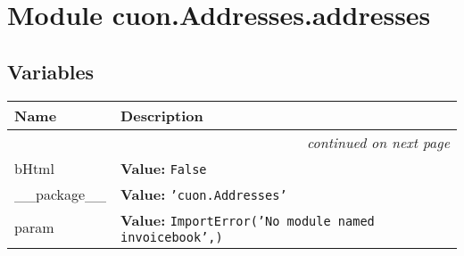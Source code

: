 %
%
%


\section{Module cuon.Addresses.addresses}

    \label{cuon:Addresses:addresses}


  \subsection{Variables}

    \vspace{-1cm}
\hspace{\varindent}\begin{longtable}{|p{\varnamewidth}|p{\vardescrwidth}|l}
\cline{1-2}
\cline{1-2} \centering \textbf{Name} & \centering \textbf{Description}& \\
\cline{1-2}
\endhead\cline{1-2}\multicolumn{3}{r}{\small\textit{continued on next page}}\\\endfoot\cline{1-2}
\endlastfoot\raggedright b\-H\-t\-m\-l\- & \raggedright \textbf{Value:} 
{\tt False}&\\
\cline{1-2}
\raggedright \_\-\_\-p\-a\-c\-k\-a\-g\-e\-\_\-\_\- & \raggedright \textbf{Value:} 
{\tt \texttt{'}\texttt{cuon.Addresses}\texttt{'}}&\\
\cline{1-2}
\raggedright p\-a\-r\-a\-m\- & \raggedright \textbf{Value:} 
{\tt ImportError('No module named invoicebook',)}&\\
\cline{1-2}
\end{longtable}




